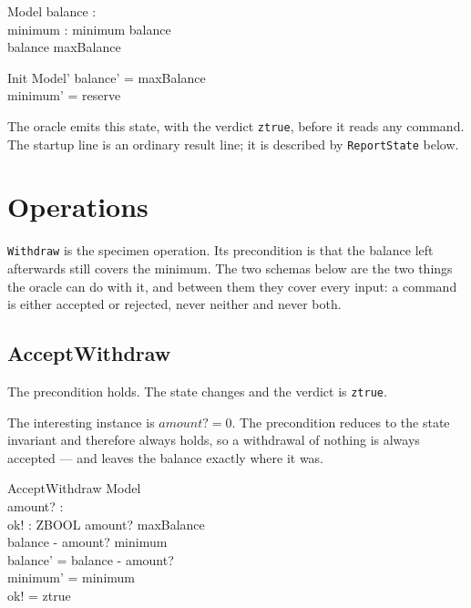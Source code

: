\documentclass[a4paper,10pt,fleqn]{article}
\begin{document}
\begin{schema}{Model}
  balance : \nat \\
  minimum : \nat
  \where
  minimum \leq balance \\
  balance \leq maxBalance
\end{schema}

\begin{schema}{Init}
  Model'
  \where
  balance' = maxBalance \\
  minimum' = reserve
\end{schema}

The oracle emits this state, with the verdict \texttt{ztrue}, before it
reads any command. The startup line is an ordinary result line; it is
described by \texttt{ReportState} below.

\section{Operations}

\texttt{Withdraw} is the specimen operation. Its precondition is that the
balance left afterwards still covers the minimum. The two schemas below
are the two things the oracle can do with it, and between them they cover
every input: a command is either accepted or rejected, never neither and
never both.

\subsection{AcceptWithdraw}

The precondition holds. The state changes and the verdict is
\texttt{ztrue}.

The interesting instance is $amount? = 0$. The precondition reduces to
the state invariant and therefore always holds, so a withdrawal of
nothing is always accepted --- and leaves the balance exactly where it
was.

\begin{schema}{AcceptWithdraw}
  \Delta Model \\
  amount? : \nat \\
  ok! : ZBOOL
  \where
  amount? \leq maxBalance \\
  balance - amount? \geq minimum \\
  balance' = balance - amount? \\
  minimum' = minimum \\
  ok! = ztrue
\end{schema}
\end{document}
